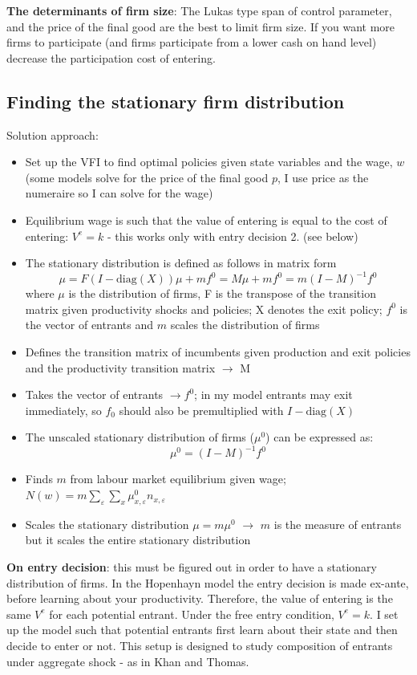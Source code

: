 \documentclass[12pt]{article}
\begin{document}
\textbf{The determinants of firm size}: The Lukas type span of control parameter, and the price of the final good are the best to limit firm size. If you want more firms to participate (and firms participate from a lower cash on hand level) decrease the participation cost of entering.

\subsection*{Finding the stationary firm distribution}
Solution approach:
\begin{itemize} \setlength\itemsep{0em}
    \item Set up the VFI to find optimal policies given state variables and the wage, $w$ (some models solve for the price of the final good $p$, I use price as the numeraire so I can solve for the wage)
    \item Equilibrium wage is such that the value of entering is equal to the cost of entering: $V^e = k$ - this works only with entry decision 2. (see below)
    \item The stationary distribution is defined as follows in matrix form 
       $$ \mu = F(I-\text{diag}(X)) \mu + mf^0 = M\mu + mf^0 = m(I-M)^{-1}f^0 $$
       where $\mu$ is the distribution of firms, F is the transpose of the transition matrix given productivity shocks and policies; X denotes the exit policy; $f^0$ is the vector of entrants and $m$ scales the distribution of firms
    \item Defines the transition matrix of incumbents given production and exit policies and the productivity transition matrix $\rightarrow$ M
    \item Takes the vector of entrants $\rightarrow f^0$; in my model entrants may exit immediately, so $f_0$ should also be premultiplied with $I-\text{diag}(X)$
    \item The unscaled stationary distribution of firms ($\mu^{0}$) can be expressed as: 
        $$\mu^{0}= (I-M)^{-1}f^0$$
    \item Finds $m$ from labour market equilibrium given wage; 
        $N(w) = m \sum_\varepsilon \sum_x \mu^{0}_{x, \varepsilon} n_{x, \varepsilon} $
    \item Scales the stationary distribution $\mu = m\mu^0$ $\rightarrow$ $m$ is the measure of entrants but it scales the entire stationary distribution
\end{itemize}
 \textbf{On entry decision}: this must be figured out in order to have a stationary distribution of firms. In the Hopenhayn model the entry decision is made ex-ante, before learning about your productivity. Therefore, the value of entering is the same $V^e$ for each potential entrant. Under the free entry condition, $V^e = k$. I set up the model such that potential entrants first learn about their state and then decide to enter or not. This setup is designed to study composition of entrants under aggregate shock - as in Khan and Thomas. \vspace{3mm} \\
\end{document}
